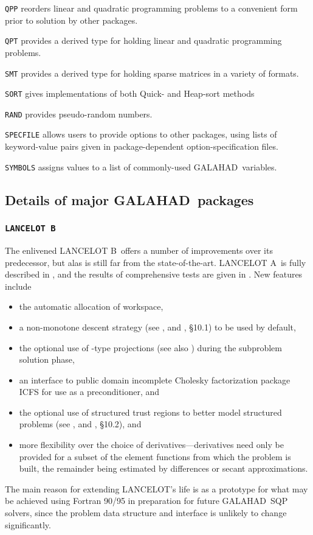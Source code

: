 \documentclass[twoside]{article}
\newcommand{\gal}{{\sf GALAHAD}}
\newcommand{\lan}{{\sf LANCELOT}}
\newcommand{\lana}{{\sf LANCELOT A}}
\newcommand{\lanb}{{\sf LANCELOT B}}
\renewcommand{\itt}[1]{\item{{\tt #1}}}
\begin{document}
\begin{description}

\itt{QPP} reorders linear and quadratic programming 
problems to a convenient form prior to solution by other packages.

\itt{QPT} provides a derived type for holding linear and quadratic programming 
problems.

\itt{SMT} provides a derived type for holding sparse matrices in a variety of
formats.

\itt{SORT} gives implementations of both Quick- and Heap-sort methods

\itt{RAND} provides pseudo-random numbers.

\itt{SPECFILE} allows users to provide options to other packages, using lists
of keyword-value pairs given in package-dependent option-specification files.

\itt{SYMBOLS} assigns values to a list of commonly-used \gal\ variables.

\end{description}

\subsection{Details of major \gal\ packages\label{major}}

\subsubsection{{\tt LANCELOT B}\label{lanb}}

The enlivened \lanb\ offers a number of improvements
over its predecessor, but alas is still far from the state-of-the-art.
\lana\ is fully described in , and the results
of comprehensive tests are given in .
New features include
\begin{itemize}
\item the automatic allocation of workspace,
\item a non-monotone descent strategy (see , and 
, \S10.1) to be used by default,
\item the optional use of -type projections 
   (see also ) 
   during the subproblem solution phase,
\item an interface to  public domain incomplete Cholesky 
   factorization package ICFS for use as a preconditioner, and
\item the optional use of structured trust regions to better model 
   structured problems (see , and
   , \S10.2), and
\item more flexibility over the choice of derivatives---derivatives need
   only be provided for a subset of the element functions from which the 
   problem is built, the remainder being estimated by differences or secant 
   approximations.  
\end{itemize}
The main reason for extending \lan's life is as a prototype
for what may be achieved using Fortran 90/95 in preparation for 
future \gal\ SQP solvers, since the problem data structure and
interface is unlikely to change significantly.
\end{document}
